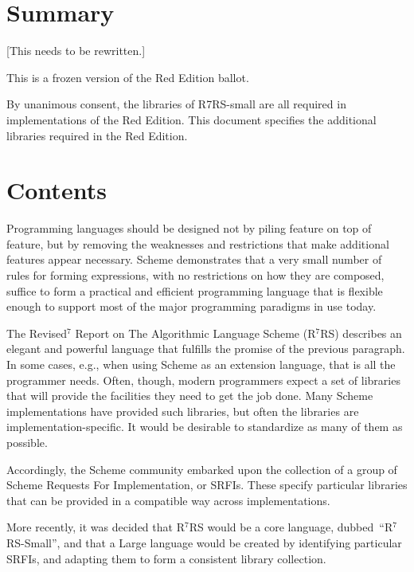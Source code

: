 \chapter*{Summary}
[This needs to be rewritten.]

This is a frozen version of the Red Edition ballot.

By unanimous consent, the libraries of R7RS-small are all required in
implementations of the Red Edition. This document specifies the
additional libraries required in the Red Edition. 





\vfill
\eject

\chapter*{Contents}
\addvspace{3.5pt}                  %
\renewcommand{\tocshrink}{-3.5pt}  %
{\footnotesize
\tableofcontents
}

\vfill
\eject


Programming languages should be designed not by piling feature on top of
feature, but by removing the weaknesses and restrictions that make additional
features appear necessary.  Scheme demonstrates that a very small number
of rules for forming expressions, with no restrictions on how they are
composed, suffice to form a practical and efficient programming language
that is flexible enough to support most of the major programming
paradigms in use today.

The Revised$^7$ Report on The Algorithmic Language Scheme (R$^7$RS)
describes an elegant and powerful language that fulfills the promise
of the previous paragraph. In some cases, e.g., when using Scheme as
an extension language, that is all the programmer needs. Often,
though, modern programmers expect a set of libraries that will provide
the facilities they need to get the job done. Many Scheme
implementations have provided such libraries, but often the libraries
are  implementation-specific.  It would be desirable to
standardize as many of them as possible.

Accordingly, the Scheme community embarked upon the collection of a
group of Scheme Requests For Implementation, or SRFIs. These specify
particular libraries that can be provided in a compatible way across
implementations. 

More recently, it was decided that R$^7$RS would be a core language,
dubbed~“R$^7$RS-Small”, and that a Large language would be created
by identifying particular SRFIs, and adapting them to form a
consistent library collection.

